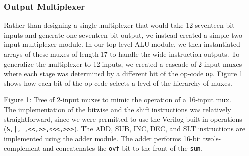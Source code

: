 \documentclass[11pt]{article}
\begin{document}
\subsubsection{Output Multiplexer}
Rather than designing a single multiplexer that would take 12 seventeen bit inputs and generate one seventeen bit output, we instead created a simple two-input multiplexer module. In our top level ALU module, we then instantiated arrays of these muxes of length 17 to handle the wide instruction outputs. To generalize the multiplexer to 12 inputs, we created a cascade of 2-input muxes where each stage was determined by a different bit of the op-code \texttt{op}. Figure 1 shows how each bit of the op-code selects a level of the hierarchy of muxes.


\begin{adjustwidth}{-4em}{}
\end{adjustwidth}

Figure 1: Tree of 2-input muxes to mimic the operation of a 16-input mux.
\\

The implementation of the bitwise and the shift instructions was relatively straightforward, since we were permitted to use the Verilog built-in operations (\texttt{\&,|,~,<<,>>,<<<,>>>}). The ADD, SUB, INC, DEC, and SLT instructions are implemented using the adder module. The adder performs 16-bit two's-complement and concatenates the \texttt{ovf} bit to the front of the \texttt{sum}. 
\end{document}
